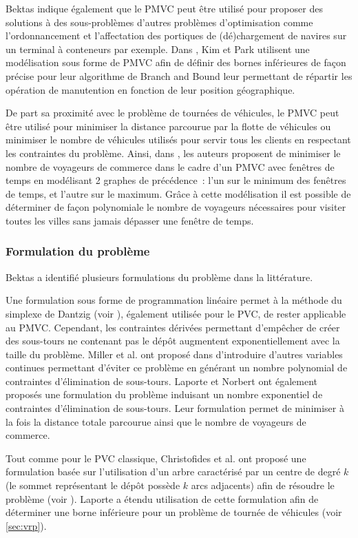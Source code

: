   Bektas indique également que le PMVC peut être utilisé pour proposer des solutions à des sous-problèmes d'autres problèmes d'optimisation comme l'ordonnancement et l'affectation des portiques de (dé)chargement de navires sur un terminal à conteneurs par exemple. Dans \cite{Kim2004}, Kim et Park utilisent une modélisation sous forme de PMVC afin de définir des bornes inférieures de façon précise pour leur algorithme de Branch and Bound leur permettant de répartir les opération de manutention en fonction de leur position géographique.
  
  De part sa proximité avec le problème de tournées de véhicules, le PMVC peut être utilisé pour minimiser la distance parcourue par la flotte de véhicules ou minimiser le nombre de véhicules utilisés pour servir tous les clients en respectant les contraintes du problème. Ainsi, dans \cite{Mitrovic-Minic2006}, les auteurs proposent de minimiser le nombre de voyageurs de commerce dans le cadre d'un PMVC avec fenêtres de temps en modélisant 2 graphes de précédence~: l'un sur le minimum des fenêtres de temps, et l'autre sur le maximum. Grâce à cette modélisation il est possible de déterminer de façon polynomiale le nombre de voyageurs nécessaires pour visiter toutes les villes sans jamais dépasser une fenêtre de temps.
  
  \subsubsection{Formulation du problème}
  Bektas a identifié plusieurs formulations du problème dans la littérature.
  
  Une formulation sous forme de programmation linéaire permet à la méthode du simplexe de Dantzig (voir \cite{Dantzig1954}), également utilisée pour le PVC, de  rester applicable au PMVC. Cependant, les contraintes dérivées permettant d'empêcher de créer des sous-tours ne contenant pas le dépôt augmentent exponentiellement avec la taille du problème. Miller et al. ont proposé dans \cite{Miller1960} d'introduire d'autres variables continues permettant d'éviter ce problème en générant un nombre polynomial de contraintes d'élimination de sous-tours.
  Laporte et Norbert ont également proposés une formulation du problème induisant un nombre exponentiel de contraintes d'élimination de sous-tours. Leur formulation permet de minimiser à la fois la distance totale parcourue ainsi que le nombre de voyageurs de commerce.
  
  Tout comme pour le PVC classique, Christofides et al. ont proposé une formulation basée sur l'utilisation d'un arbre caractérisé par un centre de degré $k$ (le sommet représentant le dépôt possède $k$ arcs adjacents) afin de résoudre le problème (voir \cite{Christofides1981}). Laporte \cite{Laporte1980} a étendu utilisation de cette formulation afin de déterminer une borne inférieure pour un problème de tournée de véhicules (voir \ref{sec:vrp}).
  
